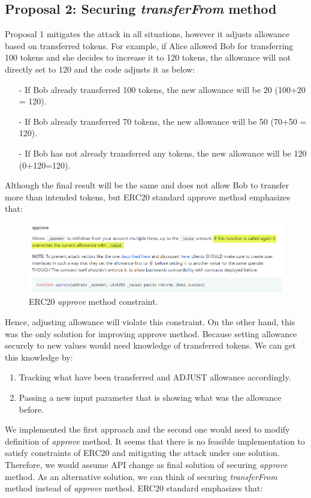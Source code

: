 \subsection{Proposal 2: Securing \textit{transferFrom} method}
Proposal 1 mitigates the attack in all situations, however it adjusts allowance based on transferred tokens. For example, if Alice allowed Bob for transferring 100 tokens and she decides to increase it to 120 tokens, the allowance will not directly set to 120 and the code adjusts it as below:
\begin{itemize}
	\item[-] If Bob already transferred 100 tokens, the new allowance will be 20 (100+20 = 120).
	\item[-] If Bob already transferred 70 tokens, the new allowance will be 50 (70+50 = 120).
	\item[-] If Bob has not already transferred any tokens, the new allowance will be 120 (0+120=120).\newline
\end{itemize}
\noindent Although the final result will be the same and does not allow Bob to transfer more than intended tokens, but ERC20 standard approve method emphasizes that:
\begin{figure}[H]
	\centering
	\includegraphics[width=1.0\linewidth]{figures/multiple_withdrawal_28.png}
	\caption{ERC20 \textit{approve} method constraint.}
\end{figure}
Hence, adjusting allowance will violate this constraint. On the other hand, this was the only solution for improving approve method. Because setting allowance securely to new values would need knowledge of transferred tokens. We can get this knowledge by:
\begin{enumerate}
	\item Tracking what have been transferred and ADJUST allowance accordingly.
	\item Passing a new input parameter that is showing what was the allowance before.
\end{enumerate}
We implemented the first approach and the second one would need to modify definition of \textit{approve} method. It seems that there is no feasible implementation to satisfy constraints of ERC20 and mitigating the attack under one solution. Therefore, we would assume API change as final solution of securing \textit{approve} method. As an alternative solution, we can think of securing \textit{transferFrom} method instead of \textit{approve} method. ERC20 standard emphasizes that:
